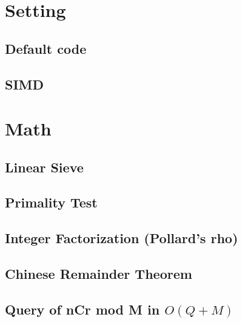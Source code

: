\documentclass[9pt,landscape,a4paper,twocolumn]{extarticle}
\begin{document}
\tableofcontents


\section{Setting}

\subsection{Default code}


\subsection{SIMD}



\section{Math}

% 

\subsection{Linear Sieve}


\subsection{Primality Test}


\subsection{Integer Factorization (Pollard's rho)}


\subsection{Chinese Remainder Theorem}


\subsection{Query of nCr mod M in $O(Q+M)$}

\end{document}
